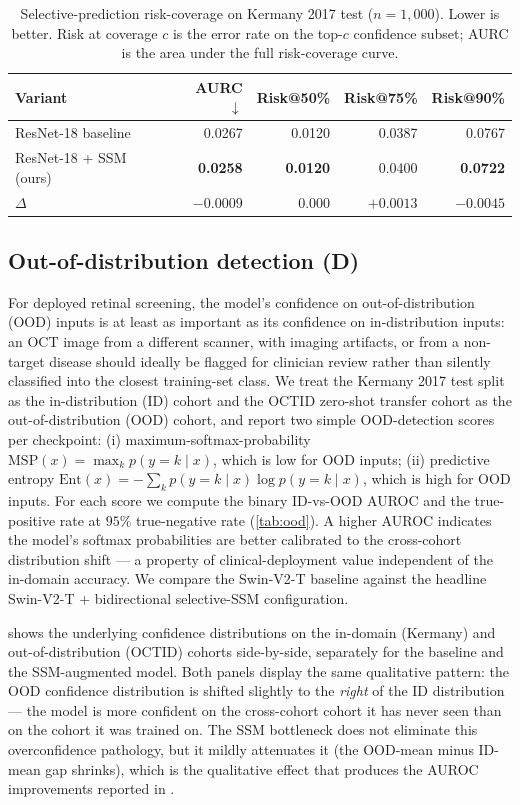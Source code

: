 \documentclass[5p]{elsarticle}
\begin{document}
\begin{table}[t]
\centering\small
\caption{Selective-prediction risk-coverage on Kermany 2017 test ($n=1{,}000$). Lower is better. Risk at coverage $c$ is the error rate on the top-$c$ confidence subset; AURC is the area under the full risk-coverage curve.}
\label{tab:selective}
\setlength{\tabcolsep}{6pt}
\begin{tabular}{l rrrr}
\toprule
Variant & AURC $\downarrow$ & Risk@50\% & Risk@75\% & Risk@90\% \\
\midrule
ResNet-18 baseline       & 0.0267 & 0.0120 & 0.0387 & 0.0767 \\
ResNet-18 + SSM (ours)   & \textbf{0.0258} & \textbf{0.0120} & 0.0400 & \textbf{0.0722} \\
$\Delta$                 & $\mathbf{-0.0009}$ & $0.000$ & $+0.0013$ & $\mathbf{-0.0045}$ \\
\bottomrule
\end{tabular}
\end{table}

\subsection{Out-of-distribution detection (D)}
\label{sec:ood}
For deployed retinal screening, the model's confidence on out-of-distribution (OOD) inputs is at least as important as its confidence on in-distribution inputs: an OCT image from a different scanner, with imaging artifacts, or from a non-target disease should ideally be flagged for clinician review rather than silently classified into the closest training-set class. We treat the Kermany 2017 test split as the in-distribution (ID) cohort and the OCTID zero-shot transfer cohort as the out-of-distribution (OOD) cohort, and report two simple OOD-detection scores per checkpoint:
(i) maximum-softmax-probability $\mathrm{MSP}(x) = \max_k p(y=k\mid x)$, which is low for OOD inputs;
(ii) predictive entropy $\mathrm{Ent}(x) = -\sum_k p(y=k\mid x) \log p(y=k\mid x)$, which is high for OOD inputs.
For each score we compute the binary ID-vs-OOD AUROC and the true-positive rate at $95\%$ true-negative rate (\cref{tab:ood}). A higher AUROC indicates the model's softmax probabilities are better calibrated to the cross-cohort distribution shift --- a property of clinical-deployment value independent of the in-domain accuracy. We compare the Swin-V2-T baseline against the headline Swin-V2-T $+$ bidirectional selective-SSM configuration.

 shows the underlying confidence distributions on the in-domain (Kermany) and out-of-distribution (OCTID) cohorts side-by-side, separately for the baseline and the SSM-augmented model. Both panels display the same qualitative pattern: the OOD confidence distribution is shifted slightly to the \emph{right} of the ID distribution --- the model is more confident on the cross-cohort cohort it has never seen than on the cohort it was trained on. The SSM bottleneck does not eliminate this overconfidence pathology, but it mildly attenuates it (the OOD-mean minus ID-mean gap shrinks), which is the qualitative effect that produces the AUROC improvements reported in .
\end{document}
